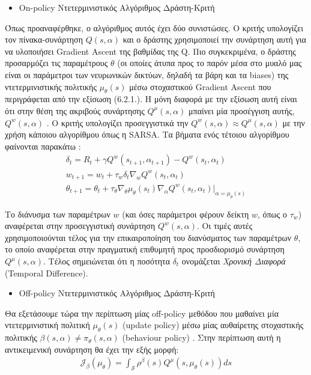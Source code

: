 \documentclass[11pt]{article} %
\numberwithin{equation}{subsection}
\begin{document}
\begin{itemize}
\item On-policy Ντετερμινιστικός Αλγόριθμος Δράστη-Κριτή
\end{itemize}
Όπως προαναφέρθηκε, ο αλγόριθμος αυτός έχει δύο συνιστώσες. Ο κριτής υπολογίζει τον πίνακα-συνάρτηση $Q(s, \alpha)$ και ο δράστης χρησιμοποιεί την συνάρτηση αυτή για να υλοποιήσει Gradient Ascent της βαθμίδας της Q. Πιο συγκεκριμένα, ο δράστης προσαρμόζει τις παραμέτρους $\theta$ (οι οποίες άτυπα προς το παρόν μέσα στο μυαλό μας είναι οι παράμετροι των νευρωνικών δικτύων, δηλαδή τα βάρη και τα biases) της ντετερμινιστικής πολιτικής $\mu_{\theta}(s)$ μέσω στοχαστικού Gradient Ascent που περιγράφεται από την εξίσωση (6.2.1.). Η μόνη διαφορά με την εξίσωση αυτή είναι ότι στην θέση της ακριβούς συνάρτησης $Q^{\mu}(s,\alpha)$ μπαίνει μία προσέγγιση αυτής, $Q^{w}(s,\alpha)$ \cite{dpga}. Ο κριτής υπολογίζει προσεγγιστικά την $Q^{w}(s,\alpha) \approx Q^{\mu}(s,\alpha)$ με την χρήση κάποιου αλγορίθμου όπως η SARSA. Τα βήματα ενός τέτοιου αλγορίθμου φαίνονται παρακάτω \cite{sutton}:
\begin{align*}
\delta_{t} = R_{t} + \gamma Q^{w}(s_{t+1},\alpha_{t+1}) - Q^{w}(s_{t},\alpha_{t})\\
w_{t+1} = w_{t} + \tau_{w} \delta_{t} \nabla_{w} Q^{w}(s_{t},\alpha_{t})\\
\theta_{t+1} = \theta_{t} + \tau_{\theta} \nabla_{\theta} \mu_{\theta}(s_{t}) \nabla_{\alpha} Q^{w}(s_{t},\alpha_{t})|_{\alpha = \mu_{\theta}(s)}
\end{align*}

Το διάνυσμα των παραμέτρων $w$ (και όσες παράμετροι φέρουν δείκτη $w$, όπως ο $\tau_{w}$) αναφέρεται στην προσεγγιστική συνάρτηση $Q^{w}(s,\alpha)$. Οι τιμές αυτές χρησιμοποιούνται τέλος για την επικαιροποίηση του διανύσματος των παραμέτρων $\theta$, το οποίο αναφέρεται στην πραγματική επιθυμητή προς προσδιορισμό συνάρτηση $Q^{\mu}(s,\alpha)$. Τέλος σημειώνεται ότι η ποσότητα $\delta_{t}$ ονομάζεται \textit{Χρονική Διαφορά} (Temporal Difference).\\

\begin{itemize}
\item Off-policy Ντετερμινιστικός Αλγόριθμος Δράστη-Κριτή
\end{itemize}
Θα εξετάσουμε τώρα την περίπτωση μίας off-policy μεθόδου που μαθαίνει μία ντετερμινιστική πολιτική $\mu_{\theta}(s)$ (update policy) μέσω μίας αυθαίρετης στοχαστικής πολιτικής $\beta(s,\alpha) \neq \pi_{\theta}(s,\alpha) $ (behaviour policy) \cite{dpga}. Στην περίπτωση αυτή η αντικειμενική συνάρτηση θα έχει την εξής μορφή:
\begin{align*}
\mathcal{J}_{\beta}(\mu_{\theta}) = \int_{\mathcal{S}} \rho^{\beta}(s) Q^{\mu}(s, \mu_{\theta}(s))ds
\end{align*}
\end{document}
